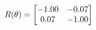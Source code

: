 \documentclass[preview]{standalone}
\begin{document}
\begin{align*}
\special{dvisvgm:raw <g id='unique000'>}R(\theta) = \begin{bmatrix}-1.00 & -0.07\\0.07 & -1.00\end{bmatrix}\special{dvisvgm:raw </g>}
\end{align*}
\end{document}

